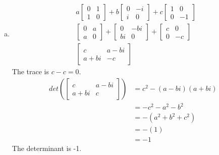 \documentclass[12pt]{article}
\begin{document}
\begin{enumerate}[(a)]
	\item 
		\begin{align*}
			&a
				\begin{bmatrix}
					0 & 1\\
					1 & 0
				\end{bmatrix}
				+b
				\begin{bmatrix}
					0 & -i\\
					i & 0
				\end{bmatrix}
				+c
				\begin{bmatrix}
					1 & 0\\
					0 & -1
				\end{bmatrix}\\
			&
				\begin{bmatrix}
					0 & a\\
					a & 0
				\end{bmatrix}
				+
				\begin{bmatrix}
					0 & -bi\\
					bi & 0
				\end{bmatrix}
				+
				\begin{bmatrix}
					c & 0\\
					0 & -c
				\end{bmatrix}\\
			&
				\begin{bmatrix}
					c & a-bi\\
					a+bi & -c
				\end{bmatrix}
		\end{align*}
		The trace is $ c-c = 0 $.
		\begin{align*}
			det\left(\begin{bmatrix}
				c & a-bi\\
				a+bi & c
			\end{bmatrix}\right) &= c^2 - (a-bi)(a+bi)\\
			&= -c^2 -a^2 -b^2\\
			&= -(a^2+b^2+c^2)\\
			&= -(1)\\
			&= -1
		\end{align*}
		The determinant is -1.
	

\end{enumerate}
\end{document}
